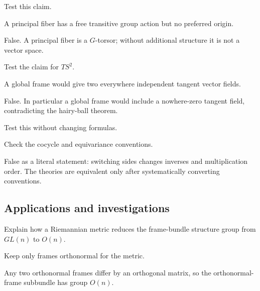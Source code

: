 \begin{exercise}\label{exr:vii08-ped-10}
Test this claim.
\end{exercise}
\begin{hint}
A principal fiber has a free transitive group action but no preferred origin.
\end{hint}
\begin{solution}
False.  A principal fiber is a \(G\)-torsor; without additional structure it is not a vector space.
\end{solution}

\begin{exercise}\label{exr:vii08-ped-11}
Test the claim for \(TS^2\).
\end{exercise}
\begin{hint}
A global frame would give two everywhere independent tangent vector fields.
\end{hint}
\begin{solution}
False.  In particular a global frame would include a nowhere-zero tangent field, contradicting the hairy-ball theorem.
\end{solution}

\begin{exercise}\label{exr:vii08-ped-12}
Test this without changing formulas.
\end{exercise}
\begin{hint}
Check the cocycle and equivariance conventions.
\end{hint}
\begin{solution}
False as a literal statement: switching sides changes inverses and multiplication order.  The theories are equivalent only after systematically converting conventions.
\end{solution}

\subsection*{Applications and investigations}

\begin{exercise}\label{exr:vii08-ped-13}
Explain how a Riemannian metric reduces the frame-bundle structure group from \(GL(n)\) to \(O(n)\).
\end{exercise}
\begin{hint}
Keep only frames orthonormal for the metric.
\end{hint}
\begin{solution}
Any two orthonormal frames differ by an orthogonal matrix, so the orthonormal-frame subbundle has group \(O(n)\).
\end{solution}

